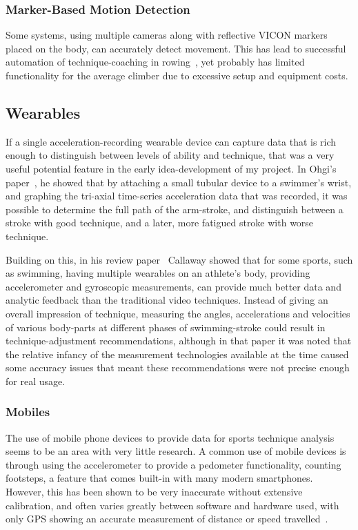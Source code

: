 \subsubsection{Marker-Based Motion Detection}
Some systems, using multiple cameras along with reflective VICON markers placed on the body, can accurately detect movement.
This has lead to successful automation of technique-coaching in rowing~\cite{automaticrowingcoach}, yet probably has limited functionality for the average climber due to excessive setup and equipment costs.

\subsection{Wearables}
If a single acceleration-recording wearable device can capture data that is rich enough to distinguish between levels of ability and technique, that was a very useful potential feature in the early idea-development of my project.
In Ohgi's paper~\cite{oghiswim}, he showed that by attaching a small tubular device to a swimmer's wrist, and graphing the tri-axial time-series acceleration data that was recorded, it was possible to determine the full path of the arm-stroke, and distinguish between a stroke with good technique, and a later, more fatigued stroke with worse technique.

Building on this, in his review paper~\cite{callawayvideoacccomp} Callaway showed that for some sports, such as swimming, having multiple wearables on an athlete's body, providing accelerometer and gyroscopic measurements, can provide much better data and analytic feedback than the traditional video techniques.
Instead of giving an overall impression of technique, measuring the angles, accelerations and velocities of various body-parts at different phases of swimming-stroke could result in technique-adjustment recommendations, although in that paper it was noted that the relative infancy of the measurement technologies available at the time caused some accuracy issues that meant these recommendations were not precise enough for real usage.

\subsubsection{Mobiles}
The use of mobile phone devices to provide data for sports technique analysis seems to be an area with very little research.
A common use of mobile devices is through using the accelerometer to provide a pedometer functionality, counting footsteps, a feature that comes built-in with many modern smartphones.
However, this has been shown to be very inaccurate without extensive calibration, and often varies greatly between software and hardware used, with only GPS showing an accurate measurement of distance or speed travelled~\cite{pedometer}.

